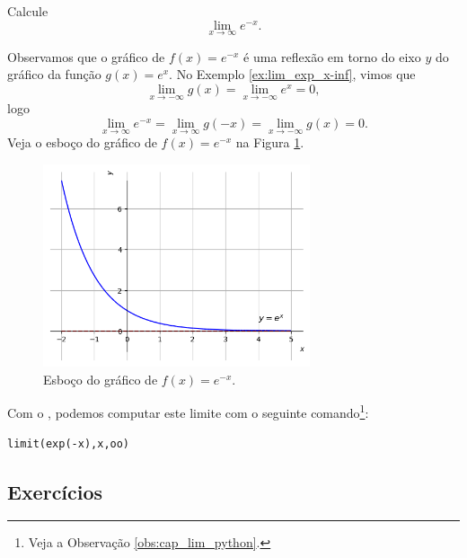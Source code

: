 \begin{exeresol}
  Calcule
  \begin{equation}
    \lim_{x\to \infty} e^{-x}.
  \end{equation}
\end{exeresol}
\begin{resol}
  Observamos que o gráfico de $f(x)=e^{-x}$ é uma reflexão em torno do eixo $y$ do gráfico da função $g(x)=e^x$. No Exemplo \ref{ex:lim_exp_x-inf}, vimos que
  \begin{equation}
    \lim_{x\to -\infty} g(x) = \lim_{x\to -\infty} e^{x} = 0,
  \end{equation}
  logo
  \begin{equation}
    \lim_{x\to \infty} e^{-x} = \lim_{x\to \infty} g(-x) = \lim_{x\to -\infty} g(x) = 0.
  \end{equation}
  Veja o esboço do gráfico de $f(x)=e^{-x}$ na Figura \ref{fig:exeresol_lim_exp_xinf}.

  \begin{figure}[H]
    \centering
    \includegraphics[width=0.7\textwidth]{./cap_lim/dados/fig_exeresol_lim_exp_xinf/fig_exeresol_lim_exp_xinf}
    \caption{Esboço do gráfico de $f(x)=e^{-x}$.}
    \label{fig:exeresol_lim_exp_xinf}
  \end{figure}  

  \ifispython
  Com o \sympy, podemos computar este limite com o seguinte comando\footnote{Veja a Observação \ref{obs:cap_lim_python}.}:
\begin{verbatim}
limit(exp(-x),x,oo)
\end{verbatim}
  \fi
\end{resol}

\subsection*{Exercícios}

